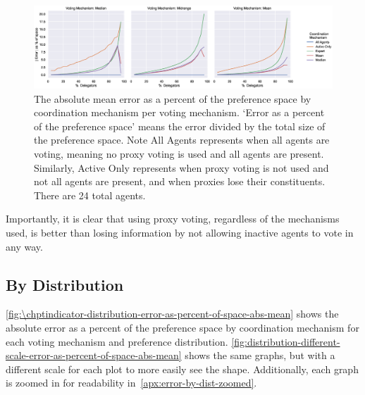 \begin{landscape}
    \begin{figure}[p]
        \centering
        \includegraphics[scale=0.55]
        {content/chapter2/figures/vm_col_cm_hue_error_as_percent_of_space_abs_mean}
        \caption{
            The absolute mean error as a percent of the preference space by
            coordination mechanism per voting mechanism.
            `Error as a percent of the preference space' means the error divided by
            the total size of the preference space.
            Note All Agents represents when all agents are voting, meaning no proxy
            voting is used and all agents are present.
            Similarly, Active Only represents when proxy voting is not used and not
            all agents are present, and when proxies lose their constituents.
            There are 24 total agents.
        }
        \label{fig:\chptindicator-vm-col-cm-hue-error-as-percent-of-space-abs-mean}
    \end{figure}
\end{landscape}

Importantly, it is clear that using proxy voting, regardless of the mechanisms used,
is better than losing information by not allowing inactive agents to vote in any way.

\subsection{By Distribution}\label{subsec:\chptindicator-results-distribution}
\autoref{fig:\chptindicator-distribution-error-as-percent-of-space-abs-mean} shows
the absolute error as a percent of the preference space by coordination mechanism for
each voting mechanism and preference distribution.
\autoref{fig:distribution-different-scale-error-as-percent-of-space-abs-mean} shows
the same graphs, but with a different scale for each plot to more easily see the shape.
Additionally, each graph is zoomed in for readability
in~\autoref{apx:error-by-dist-zoomed}.

